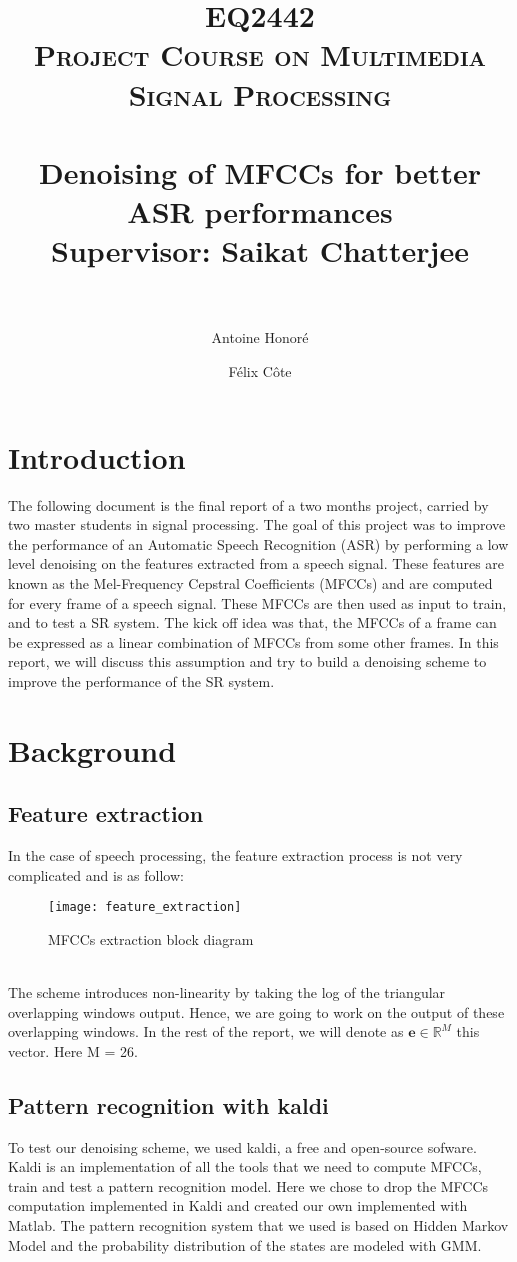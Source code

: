 \documentclass[a4paper]{report}
\title{	 
\textsc{EQ2442\\Project Course on Multimedia Signal Processing}\\[25pt] 
\horrule{1pt} \\[0.4cm] %
\huge {Denoising of MFCCs for better ASR performances} \\[0.4 cm] %
\Large{Supervisor: Saikat Chatterjee}\\[0.4 cm]
\horrule{2pt} \\[0.2cm] %
}
\author{ Antoine Honoré\\ \email{honore@kth.se} \and Félix Côte\\\email{fcote@kth.se} }
\begin{document}
\maketitle
\tableofcontents
\section*{Introduction}
The following document is the final report of a two months project, carried by two master students in signal processing. The goal of this project was to improve the performance of an Automatic Speech Recognition (ASR) by performing a low level denoising on the features extracted from  a speech signal. These features are known as the Mel-Frequency Cepstral Coefficients (MFCCs) and are computed for every frame of a speech signal. These MFCCs are then used as input to train, and to test a SR system. The kick off idea was that, the MFCCs of a frame can be expressed as a linear combination of MFCCs from some other frames. In this report, we will discuss this assumption and try to build a denoising scheme to improve the performance of the SR system.
\section{Background}
\subsection{Feature extraction}
In the case of speech processing, the feature extraction process is not very complicated and is as follow:
\begin{figure}[!ht]
\centering
\texttt{[image: feature\_extraction]}
\caption{MFCCs extraction block diagram}
\label{feature_extraction}

\end{figure}\\
The scheme introduces non-linearity by taking the log of the triangular overlapping windows output. Hence, we are going to work on the output of these overlapping windows. In the rest of the report, we will denote as $\textbf{e} \in \mathbb{R}^M$ this vector. Here M = 26.

\subsection{Pattern recognition with kaldi}
To test our denoising scheme, we used kaldi, a free and open-source sofware. Kaldi is an implementation of all the tools that we need to compute MFCCs, train and test a pattern recognition model. Here we chose to drop the MFCCs computation implemented in Kaldi and created our own implemented with Matlab. The pattern recognition system that we used is based on Hidden Markov Model and the probability distribution of the states are modeled with GMM.
\end{document}
